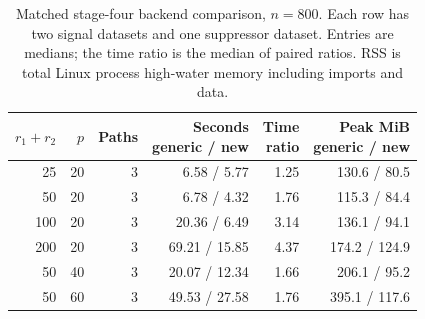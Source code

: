 \begin{table}[H]\centering\small
\begin{tabular}{rrrrrr}
\toprule
$r_1+r_2$ & $p$ & Paths & \shortstack{Seconds\\generic / new} & \shortstack{Time\\ratio} & \shortstack{Peak MiB\\generic / new} \\
\midrule
25 & 20 & 3 & 6.58 / 5.77 & 1.25 & 130.6 / 80.5 \\
50 & 20 & 3 & 6.78 / 4.32 & 1.76 & 115.3 / 84.4 \\
100 & 20 & 3 & 20.36 / 6.49 & 3.14 & 136.1 / 94.1 \\
200 & 20 & 3 & 69.21 / 15.85 & 4.37 & 174.2 / 124.9 \\
50 & 40 & 3 & 20.07 / 12.34 & 1.66 & 206.1 / 95.2 \\
50 & 60 & 3 & 49.53 / 27.58 & 1.76 & 395.1 / 117.6 \\
\bottomrule
\end{tabular}
\caption{Matched stage-four backend comparison, $n=800$. Each row has two signal datasets and one suppressor dataset. Entries are medians; the time ratio is the median of paired ratios. RSS is total Linux process high-water memory including imports and data.}\label{tab:scalingmatched}
\end{table}
